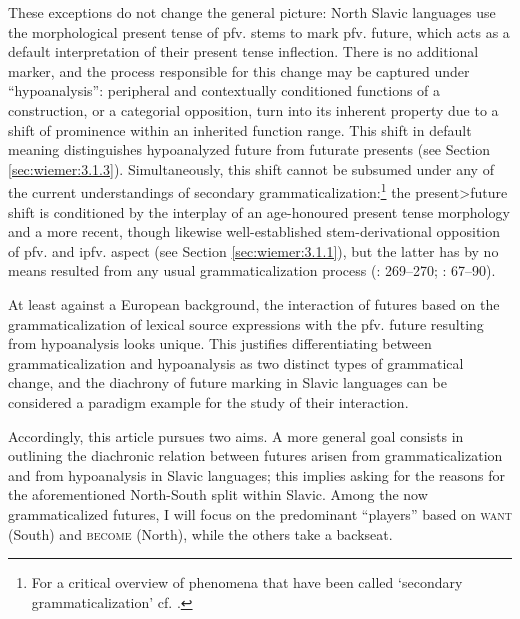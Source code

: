 \documentclass[output=paper,colorlinks,citecolor=brown]{langscibook}
\begin{document}
These exceptions do not change the general picture: North Slavic languages use the morphological present tense of pfv. stems to mark pfv. future, which acts as a default interpretation of their present tense inflection. There is no additional marker, and the process responsible for this change may be captured under “hypoanalysis”: peripheral and contextually conditioned functions of a construction, or a categorial opposition, turn into its inherent property due to a shift of prominence within an inherited function range. This shift in default meaning distinguishes hypoanalyzed future from futurate presents (see Section \ref{sec:wiemer:3.1.3}). Simultaneously, this shift cannot be subsumed under any of the current understandings of secondary grammaticalization:\footnote{For a critical overview of phenomena that have been called ‘secondary grammaticalization’ cf. \citet{breban_2014}.} the present>future shift is conditioned by the interplay of an age-honoured present tense morphology and a more recent, though likewise well-established stem\hyp{}derivational opposition of pfv. and ipfv. aspect (see Section \ref{sec:wiemer:3.1.1}), but the latter has by no means resulted from any usual grammaticalization process (\cite{wiemer_2020}: 269--270; \citeyear{wiemer_2022}: 67--90).

At least against a European background, the interaction of futures based on the grammaticalization of lexical source expressions with the pfv. future resulting from hypoanalysis looks unique. This justifies differentiating between grammaticalization and hypoanalysis as two distinct types of grammatical change, and the diachrony of future marking in Slavic languages can be considered a paradigm example for the study of their interaction. 

Accordingly, this article pursues two aims. A more general goal consists in outlining the diachronic relation between futures arisen from grammaticalization and from hypoanalysis in Slavic languages; this implies asking for the reasons for the aforementioned North-South split within Slavic. Among the now grammaticalized futures, I will focus on the predominant “players” based on \textsc{want} (South) and \textsc{become} (North), while the others take a backseat. 
\end{document}
